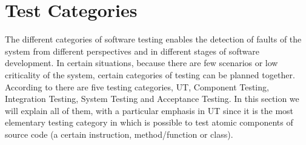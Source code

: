 {%
\section{Test Categories}
The different categories of software testing enables the detection of faults of the system from different perspectives and in different stages
of software development.
In certain situations, because there are few scenarios or low criticality of the system,
certain categories of testing can be planned together. According to \cite{citeulike:453686} there are five testing categories,
\ac{UT}, Component Testing, Integration Testing, System Testing and Acceptance Testing.
In this section we will explain all of them, with a particular emphasis in \ac{UT} since it is the most elementary testing category
in which is possible to test atomic components of source code (a certain instruction, method/function or class).\\

}
